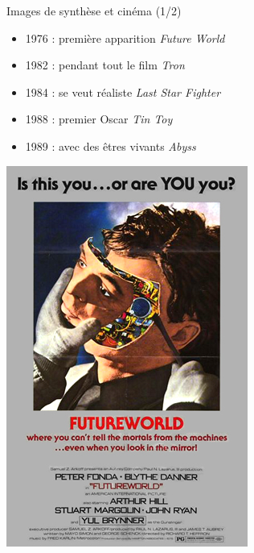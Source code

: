 \begin{frame}{Images de synthèse et cinéma (1/2)}
\begin{itemize}
\item 1976 : première apparition \textit{Future World}
\item 1982 : pendant tout le film \textit{Tron}
\item 1984 : se veut réaliste \textit{Last Star Fighter}
\item 1988 : premier Oscar \textit{Tin Toy}
\item 1989 : avec des êtres vivants \textit{Abyss}
\end{itemize}
\begin{center}
\includegraphics[height=0.28\textheight]{figs/Futureworld.jpg}
\hspace{0.1cm}

\end{center}
\end{frame}
